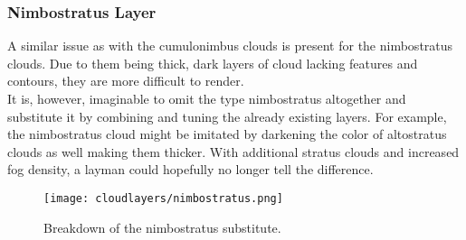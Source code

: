 \subsubsection{Nimbostratus Layer}
A similar issue as with the cumulonimbus clouds is present for the nimbostratus clouds.
Due to them being thick, dark layers of cloud lacking features and contours, they are more difficult to render.
\\
It is, however, imaginable to omit the type nimbostratus altogether and substitute it by combining and tuning the already existing layers.
For example, the nimbostratus cloud might be imitated by darkening the color of altostratus clouds as well making them thicker. 
With additional stratus clouds and increased fog density, a layman could hopefully no longer tell the difference.

\begin{figure}[H]
    \texttt{[image: cloudlayers/nimbostratus.png]}
    \caption{Breakdown of the nimbostratus substitute.}
    \label{img:cloudlayer:nimbostratus}
\end{figure}